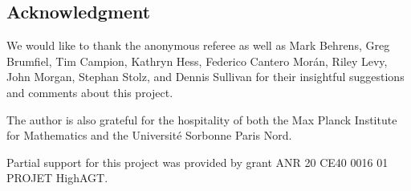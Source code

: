 
\subsection*{Acknowledgment}

We would like to thank the anonymous referee as well as Mark Behrens, Greg Brumfiel, Tim Campion, Kathryn Hess, Federico Cantero Mor\'an, Riley Levy, John Morgan, Stephan Stolz, and Dennis Sullivan for their insightful suggestions and comments about this project.

The author is also grateful for the hospitality of both the Max Planck Institute for Mathematics and the Universit\'e Sorbonne Paris Nord.

Partial support for this project was provided by grant ANR 20 CE40 0016 01 PROJET HighAGT.